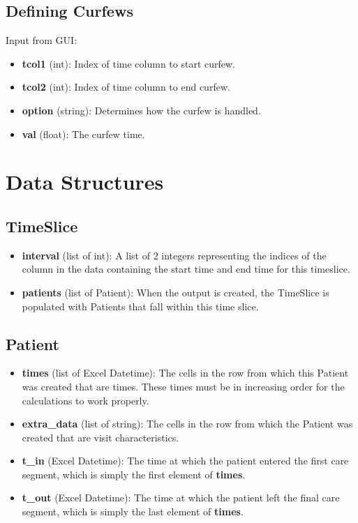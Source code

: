\documentclass{article}
\begin{document}
\subsection*{Defining Curfews}
Input from GUI:

\begin{itemize}
	\item \textbf{tcol1} (int): Index of time column to start curfew.
	\item \textbf{tcol2} (int): Index of time column to end curfew.
	\item \textbf{option} (string): Determines how the curfew is handled.
	\item \textbf{val} (float): The curfew time.
\end{itemize}

\section{Data Structures}

\subsection*{TimeSlice}

\begin{itemize}
	\item \textbf{interval} (list of int): A list of 2 integers representing the indices of the column in the data containing the start time and end time for this timeslice.
	\item \textbf{patients} (list of Patient): When the output is created, the TimeSlice is populated with Patients that fall within this time slice.
\end{itemize}

\subsection*{Patient}

\begin{itemize}
	\item \textbf{times} (list of Excel Datetime): The cells in the row from which this Patient was created that are times. These times must be in increasing order for the calculations to work properly.
	\item \textbf{extra\_data} (list of string): The cells in the row from which the Patient was created that are visit characteristics.
	\item \textbf{t\_in} (Excel Datetime): The time at which the patient entered the first care segment, which is simply the first element of \textbf{times}.
	\item \textbf{t\_out} (Excel Datetime): The time at which the patient left the final care segment, which is simply the last element of \textbf{times}.
\end{itemize}
\end{document}
